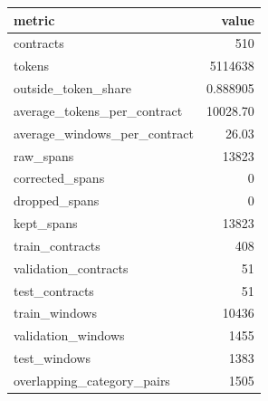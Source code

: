 \begin{tabular}{lr}
\toprule
metric & value \\
\midrule
contracts & 510 \\
tokens & 5114638 \\
outside\_token\_share & 0.888905 \\
average\_tokens\_per\_contract & 10028.70 \\
average\_windows\_per\_contract & 26.03 \\
raw\_spans & 13823 \\
corrected\_spans & 0 \\
dropped\_spans & 0 \\
kept\_spans & 13823 \\
train\_contracts & 408 \\
validation\_contracts & 51 \\
test\_contracts & 51 \\
train\_windows & 10436 \\
validation\_windows & 1455 \\
test\_windows & 1383 \\
overlapping\_category\_pairs & 1505 \\
\bottomrule
\end{tabular}
